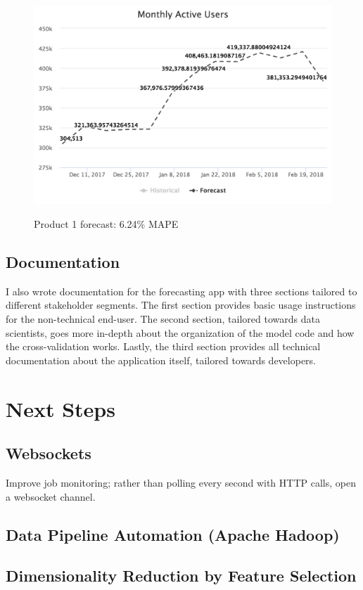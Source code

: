 \documentclass[11pt, oneside]{article}
\begin{document}
\begin{figure}[h]
  \caption{Product 1 forecast: 6.24\% MAPE}
  \centering
  \includegraphics[width=12.5cm]{images/Product_1-Forecast-6_24_Percent_MAPE.png}
  \label{fig:Product_1-Forecast}
\end{figure}

\subsection{Documentation}
I also wrote documentation for the forecasting app with three sections tailored to different stakeholder segments. The first section provides basic usage instructions for the non-technical end-user. The second section, tailored towards data scientists, goes more in-depth about the organization of the model code and how the cross-validation works. Lastly, the third section provides all technical documentation about the application itself, tailored towards developers.

\section{Next Steps}
\subsection{Websockets}
Improve job monitoring; rather than polling every second with HTTP calls, open a websocket channel.
\subsection{Data Pipeline Automation (Apache Hadoop)}
\subsection{Dimensionality Reduction by Feature Selection}
\end{document}
